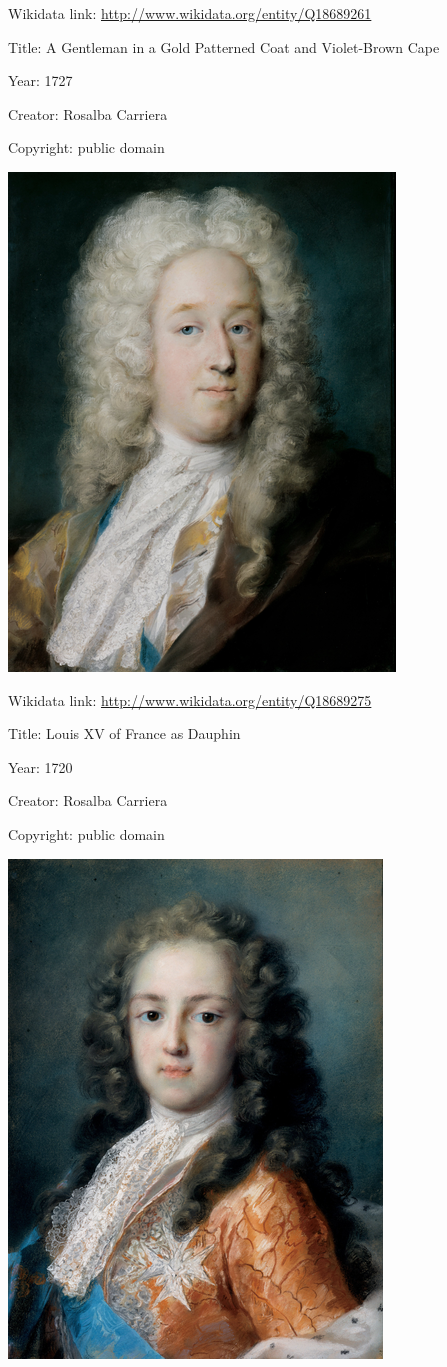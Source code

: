 \documentclass[
  letterpaper,
]{book}
\begin{document}
Wikidata link: \url{http://www.wikidata.org/entity/Q18689261}

Title: A Gentleman in a Gold Patterned Coat and Violet-Brown Cape

Year: 1727

Creator: Rosalba Carriera

Copyright: public domain

\includegraphics{paintings_files/figure-pdf/cell-2-output-4.png}

Wikidata link: \url{http://www.wikidata.org/entity/Q18689275}

Title: Louis XV of France as Dauphin

Year: 1720

Creator: Rosalba Carriera

Copyright: public domain

\includegraphics{paintings_files/figure-pdf/cell-2-output-6.png}
\end{document}
